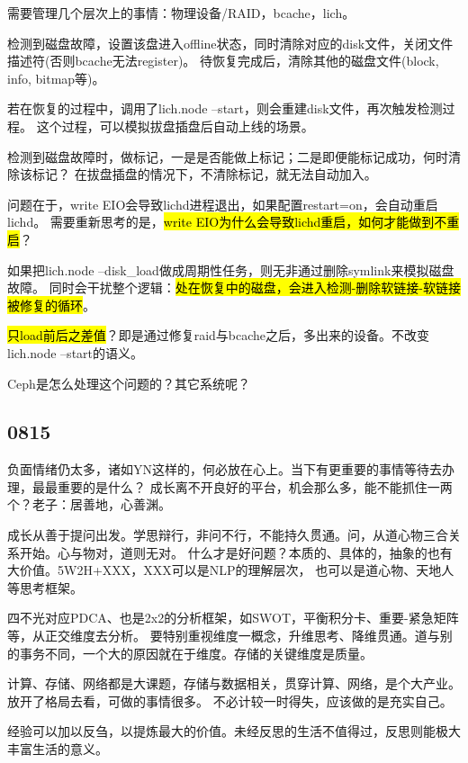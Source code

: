 需要管理几个层次上的事情：物理设备/RAID，bcache，lich。

检测到磁盘故障，设置该盘进入offline状态，同时清除对应的disk文件，关闭文件描述符(否则bcache无法register)。
待恢复完成后，清除其他的磁盘文件(block, info, bitmap等)。

若在恢复的过程中，调用了lich.node --start，则会重建disk文件，再次触发检测过程。
这个过程，可以模拟拔盘插盘后自动上线的场景。

检测到磁盘故障时，做标记，一是是否能做上标记；二是即便能标记成功，何时清除该标记？
在拔盘插盘的情况下，不清除标记，就无法自动加入。

问题在于，write EIO会导致lichd进程退出，如果配置restart=on，会自动重启lichd。
需要重新思考的是，\hl{write EIO为什么会导致lichd重启，如何才能做到不重启}？

如果把lich.node --disk\_load做成周期性任务，则无非通过删除symlink来模拟磁盘故障。
同时会干扰整个逻辑：\hl{处在恢复中的磁盘，会进入检测-删除软链接-软链接被修复的循环}。

\hl{只load前后之差值}？即是通过修复raid与bcache之后，多出来的设备。不改变lich.node --start的语义。

\begin{enumbox}
\item Ceph是怎么处理这个问题的？其它系统呢？
\end{enumbox}

\subsection{0815}

负面情绪仍太多，诸如YN这样的，何必放在心上。当下有更重要的事情等待去办理，最最重要的是什么？
成长离不开良好的平台，机会那么多，能不能抓住一两个？老子：居善地，心善渊。

成长从善于提问出发。学思辩行，非问不行，不能持久贯通。问，从道心物三合关系开始。心与物对，道则无对。
什么才是好问题？本质的、具体的，抽象的也有大价值。5W2H+XXX，XXX可以是NLP的理解层次，
也可以是道心物、天地人等思考框架。

四不光对应PDCA、也是2x2的分析框架，如SWOT，平衡积分卡、重要-紧急矩阵等，从正交维度去分析。
要特别重视维度一概念，升维思考、降维贯通。道与别的事务不同，一个大的原因就在于维度。存储的关键维度是质量。

计算、存储、网络都是大课题，存储与数据相关，贯穿计算、网络，是个大产业。放开了格局去看，可做的事情很多。
不必计较一时得失，应该做的是充实自己。

经验可以加以反刍，以提炼最大的价值。未经反思的生活不值得过，反思则能极大丰富生活的意义。

